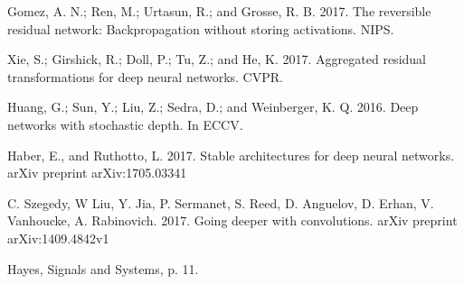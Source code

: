 \documentclass{article}
\theoremstyle{remark}
\begin{document}
\begin{thebibliography}{9}

        Gomez, A. N.; Ren, M.; Urtasun, R.; and Grosse, R. B. 2017.
        The reversible residual network: Backpropagation without storing
        activations. NIPS.

        Xie, S.; Girshick, R.; Doll, P.; Tu, Z.; and He, K. 2017. 
        Aggregated residual transformations for deep neural networks. CVPR.

        Huang, G.; Sun, Y.; Liu, Z.; Sedra, D.; and Weinberger, K. Q. 2016.
        Deep networks with stochastic depth. In ECCV.

        Haber, E., and Ruthotto, L. 2017. Stable architectures for deep
        neural networks. arXiv preprint arXiv:1705.03341

    C. Szegedy, W Liu, Y. Jia, P. Sermanet, S. Reed, D. Anguelov, D. Erhan, 
    V. Vanhoucke, A. Rabinovich. 2017.
    Going deeper with convolutions. arXiv preprint arXiv:1409.4842v1

    Hayes, Signals and Systems, p. 11.

\end{thebibliography}
\end{document}
